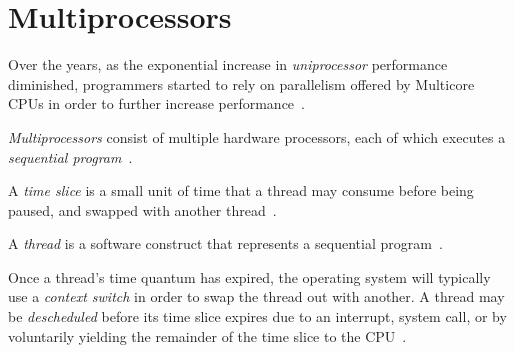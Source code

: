 



\section{Multiprocessors}
Over the years, as the exponential increase in \emph{uniprocessor} performance
diminished, programmers started to rely on parallelism offered by Multicore
CPUs in order to further increase performance~\citep{cantrill2008real}.

\emph{Multiprocessors} consist of multiple hardware processors, each of which
executes a \emph{sequential program}~\citep[Appendix~B.2]{herlihy2020art}.

A \emph{time slice} is a small unit of time that a thread may consume
before being paused, and swapped with another thread~\citep{osconcepts2021}.

A \emph{thread} is a software construct that represents a sequential program~\citep[Appendix~B.2]{herlihy2020art}.

Once a thread's time quantum has expired, the operating system will typically
use a \emph{context switch} in order to swap the thread out with another. A thread
may be \emph{descheduled} before its time slice expires due to an interrupt,
system call, or by voluntarily yielding the remainder of the time slice to the CPU~\citep[Section~3.2.3]{osconcepts2021}.

